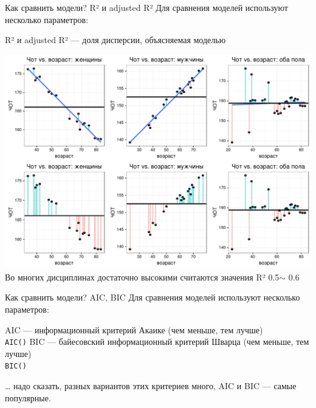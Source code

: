 \begin{frame}{Как сравнить модели? R² и adjusted R²}
Для сравнения моделей используют несколько параметров:
\begin{itemize}
\mytem R² и adjusted R² — доля дисперсии, объясняемая моделью
\end{itemize}
\includegraphics[width=0.9\linewidth]{r2.pdf}\\
\vfill
Во многих дисциплинах достаточно высокими считаются значения R² 0.5$\sim$ 0.6
\end{frame}

\begin{frame}{Как сравнить модели? AIC, BIC}
Для сравнения моделей используют несколько параметров:
\begin{itemize}
\mytem AIC — информационный критерий Акаике (чем меньше, тем лучше)\\
\scriptsize\verb"AIC()"\normalsize
\mytem BIC — байесовский информационный критерий Шварца (чем меньше, тем лучше)\\
\scriptsize\verb"BIC()"\normalsize
\end{itemize}
… надо сказать, разных вариантов этих критериев много, AIC и BIC —  самые популярные.
\end{frame}

